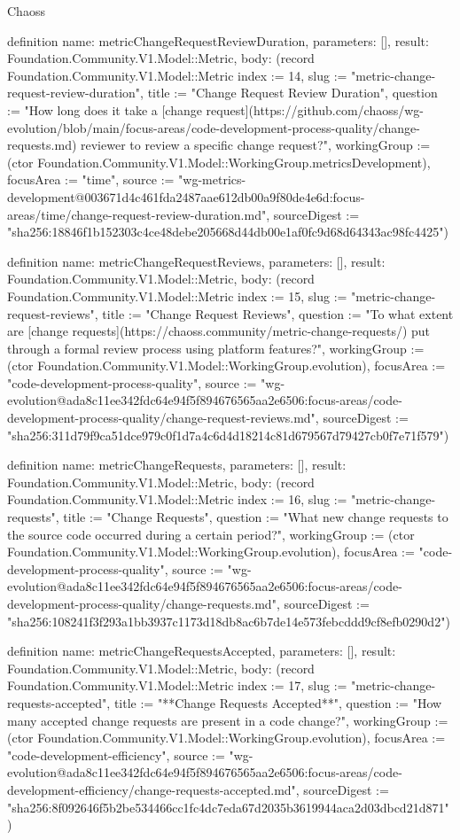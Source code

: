 \begin{lexlean}{Chaoss}
\begin{semanticmodule}
definition{
  name: metricChangeRequestReviewDuration,
  parameters: [],
  result: Foundation.Community.V1.Model::Metric,
  body: (record Foundation.Community.V1.Model::Metric {index := 14, slug := "metric-change-request-review-duration", title := "Change Request Review Duration", question := "How long does it take a [change request](https://github.com/chaoss/wg-evolution/blob/main/focus-areas/code-development-process-quality/change-requests.md) reviewer to review a specific change request?", workingGroup := (ctor Foundation.Community.V1.Model::WorkingGroup.metricsDevelopment), focusArea := "time", source := "wg-metrics-development@003671d4c461fda2487aae612db00a9f80de4e6d:focus-areas/time/change-request-review-duration.md", sourceDigest := "sha256:18846f1b152303c4ce48debe205668d44db00e1af0fc9d68d64343ac98fc4425"})
}

definition{
  name: metricChangeRequestReviews,
  parameters: [],
  result: Foundation.Community.V1.Model::Metric,
  body: (record Foundation.Community.V1.Model::Metric {index := 15, slug := "metric-change-request-reviews", title := "Change Request Reviews", question := "To what extent are [change requests](https://chaoss.community/metric-change-requests/) put through a formal review process using platform features?", workingGroup := (ctor Foundation.Community.V1.Model::WorkingGroup.evolution), focusArea := "code-development-process-quality", source := "wg-evolution@ada8c11ee342fdc64e94f5f894676565aa2e6506:focus-areas/code-development-process-quality/change-request-reviews.md", sourceDigest := "sha256:311d79f9ca51dce979c0f1d7a4c6d4d18214c81d679567d79427cb0f7e71f579"})
}

definition{
  name: metricChangeRequests,
  parameters: [],
  result: Foundation.Community.V1.Model::Metric,
  body: (record Foundation.Community.V1.Model::Metric {index := 16, slug := "metric-change-requests", title := "Change Requests", question := "What new change requests to the source code occurred during a certain period?", workingGroup := (ctor Foundation.Community.V1.Model::WorkingGroup.evolution), focusArea := "code-development-process-quality", source := "wg-evolution@ada8c11ee342fdc64e94f5f894676565aa2e6506:focus-areas/code-development-process-quality/change-requests.md", sourceDigest := "sha256:108241f3f293a1bb3937c1173d18db8ac6b7de14e573febcddd9cf8efb0290d2"})
}

definition{
  name: metricChangeRequestsAccepted,
  parameters: [],
  result: Foundation.Community.V1.Model::Metric,
  body: (record Foundation.Community.V1.Model::Metric {index := 17, slug := "metric-change-requests-accepted", title := "**Change Requests Accepted**", question := "How many accepted change requests are present in a code change?", workingGroup := (ctor Foundation.Community.V1.Model::WorkingGroup.evolution), focusArea := "code-development-efficiency", source := "wg-evolution@ada8c11ee342fdc64e94f5f894676565aa2e6506:focus-areas/code-development-efficiency/change-requests-accepted.md", sourceDigest := "sha256:8f092646f5b2be534466cc1fc4dc7eda67d2035b3619944aca2d03dbcd21d871"})
}


\end{semanticmodule}
\end{lexlean}
